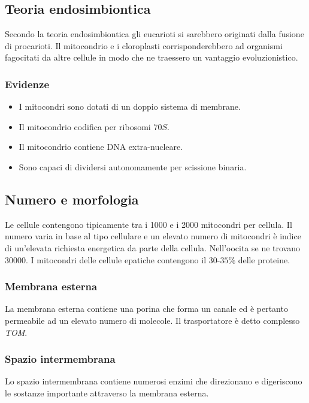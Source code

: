 	\subsection{Teoria endosimbiontica}
	Secondo la teoria endosimbiontica gli eucarioti si sarebbero originati dalla fusione di procarioti.
	Il mitocondrio e i cloroplasti corrisponderebbero ad organismi fagocitati da altre cellule in modo che ne traessero un vantaggio evoluzionistico.

		\subsubsection{Evidenze}
		\begin{multicols}{2}
			\begin{itemize}
				\item I mitocondri sono dotati di un doppio sistema di  membrane.
				\item Il mitocondrio codifica per ribosomi $70S$.
				\item Il mitocondrio contiene DNA extra-nucleare.
				\item Sono capaci di dividersi autonomamente per scissione binaria.
			\end{itemize}
		\end{multicols}

	\subsection{Numero e morfologia}
	Le cellule contengono tipicamente tra i \num{1000} e i \num{2000} mitocondri per cellula.
	Il numero varia in base al tipo cellulare e un elevato numero di mitocondri \`e indice di un'elevata richiesta energetica da parte della cellula.
	Nell'oocita se ne trovano \num{30000}.
	I mitocondri delle cellule epatiche contengono il $30$-$35\%$ delle proteine.

		\subsubsection{Membrana esterna}
		La membrana esterna contiene una porina che forma un canale ed \`e pertanto permeabile ad un elevato numero di molecole.
		Il trasportatore \`e detto complesso \emph{TOM}.
		
		\subsubsection{Spazio intermembrana}
		Lo spazio intermembrana contiene numerosi enzimi che direzionano e digeriscono le sostanze importante attraverso la membrana esterna.

